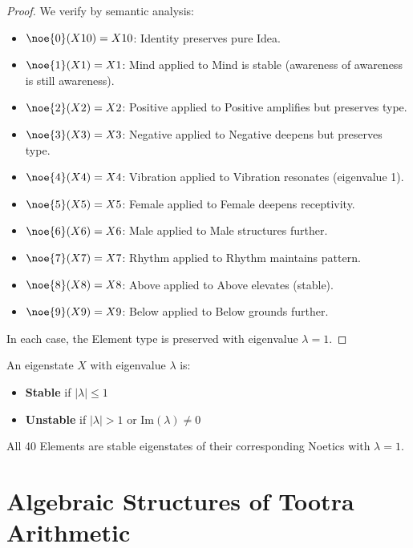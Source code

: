 \begin{proof}
We verify by semantic analysis:
\begin{itemize}
  \item $\noe{0}(X10) = X10$: Identity preserves pure Idea.
  \item $\noe{1}(X1) = X1$: Mind applied to Mind is stable (awareness of awareness is still awareness).
  \item $\noe{2}(X2) = X2$: Positive applied to Positive amplifies but preserves type.
  \item $\noe{3}(X3) = X3$: Negative applied to Negative deepens but preserves type.
  \item $\noe{4}(X4) = X4$: Vibration applied to Vibration resonates (eigenvalue 1).
  \item $\noe{5}(X5) = X5$: Female applied to Female deepens receptivity.
  \item $\noe{6}(X6) = X6$: Male applied to Male structures further.
  \item $\noe{7}(X7) = X7$: Rhythm applied to Rhythm maintains pattern.
  \item $\noe{8}(X8) = X8$: Above applied to Above elevates (stable).
  \item $\noe{9}(X9) = X9$: Below applied to Below grounds further.
\end{itemize}
In each case, the Element type is preserved with eigenvalue $\lambda = 1$.
\end{proof}

\begin{definition}
\label{def:stability}
An eigenstate $X$ with eigenvalue $\lambda$ is:
\begin{itemize}
  \item \textbf{Stable} if $|\lambda| \leq 1$
  \item \textbf{Unstable} if $|\lambda| > 1$ or $\mathrm{Im}(\lambda) \neq 0$
\end{itemize}
\end{definition}

\begin{corollary}
\label{cor:elements-stable}
All 40 Elements are stable eigenstates of their corresponding Noetics with $\lambda = 1$.
\end{corollary}

\chapter{Algebraic Structures of Tootra Arithmetic}
\label{ch:tootra-arithmetic}

